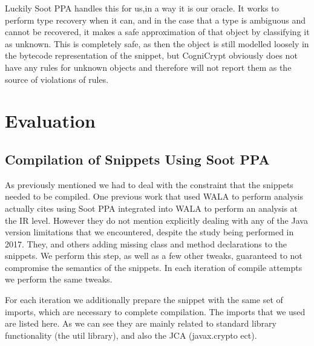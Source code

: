\documentclass[10pt, conference]{IEEEtran}
\begin{document}
Luckily Soot PPA handles this for us,in a way it is our oracle. It works to perform type recovery when it can, and in the case that a type is ambiguous and cannot be recovered, it makes a safe approximation of that object by classifying it as unknown. This is completely safe, as then the object is still modelled loosely in the bytecode representation of the snippet, but CogniCrypt obviously does not have any rules for unknown objects and therefore will not report them as the source of violations of rules.

\section{Evaluation}

\subsection{Compilation of Snippets Using Soot PPA}

As previously mentioned we had to deal with the constraint that the snippets needed to be compiled. One previous work that used WALA to perform analysis \cite{7958574} actually cites using Soot PPA integrated into WALA to perform an analysis at the IR level. However they do not mention explicitly dealing with any of the Java version limitations that we encountered, despite the study being performed in 2017. They, and others \cite{Subramanian:2013:MSO:2487085.2487106} adding missing class and method declarations to the snippets. We perform this step, as well as a few other tweaks, guaranteed to not compromise the semantics of the snippets. In each iteration of compile attempts we perform the same tweaks. 

For each iteration we additionally prepare the snippet with the same set of imports, which are necessary to complete compilation. The imports that we used are listed here. As we can see they are mainly related to standard library functionality (the util library), and also the JCA (javax.crypto ect). 
\end{document}
